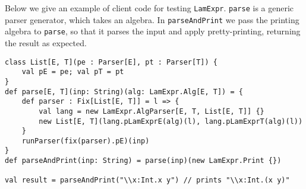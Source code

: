 Below we give an example of client code for testing \lstinline{LamExpr}. \lstinline{parse} is a generic parser generator, which takes an algebra.
In \lstinline{parseAndPrint} we pass the printing algebra to \lstinline{parse}, so that it parses the input and apply pretty-printing, returning the result as expected.

\begin{lstlisting}
class List[E, T](pe : Parser[E], pt : Parser[T]) {
    val pE = pe; val pT = pt
}
def parse[E, T](inp: String)(alg: LamExpr.Alg[E, T]) = {
    def parser : Fix[List[E, T]] = l => {
        val lang = new LamExpr.AlgParser[E, T, List[E, T]] {}
        new List[E, T](lang.pLamExprE(alg)(l), lang.pLamExprT(alg)(l))
    }
    runParser(fix(parser).pE)(inp)
}
def parseAndPrint(inp: String) = parse(inp)(new LamExpr.Print {})

val result = parseAndPrint("\\x:Int.x y") // prints "\\x:Int.(x y)"
\end{lstlisting}
